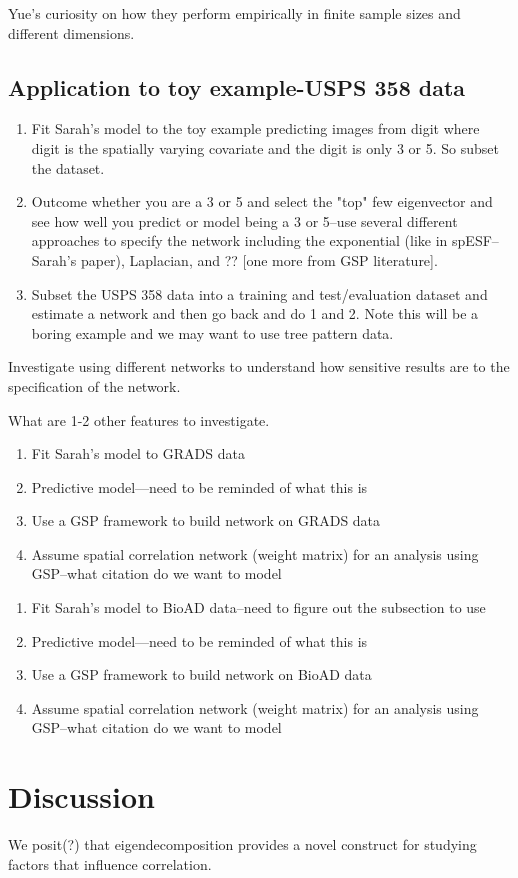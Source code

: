\documentclass[12pt]{article}
\begin{document}
Yue's curiosity on how they perform empirically in finite sample sizes and different dimensions.

\subsection{Application to toy example-USPS 358 data}
\begin{enumerate}
	\item Fit Sarah's model to the toy example predicting images from digit where digit is the spatially varying covariate and the digit is only 3 or 5. So subset the dataset.
	\item Outcome whether you are a 3 or 5 and select the "top" few eigenvector and see how well you predict or model being a 3 or 5--use several different approaches to specify the network including the exponential (like in spESF--Sarah's paper), Laplacian, and ?? [one more from GSP literature].
	\item Subset the USPS 358 data into a training and test/evaluation dataset and estimate a network and then go back and do 1 and 2.  Note this will be a boring example and we may want to use tree pattern data.
\end{enumerate}

Investigate using different networks to understand how sensitive results are to the specification of the network.

What are 1-2 other features to investigate.

\begin{enumerate}
	\item{Fit Sarah's model to GRADS data}
	\item{Predictive model---need to be reminded of what this is}
	\item{Use a GSP framework to build network on GRADS data}
	\item{Assume spatial correlation network (weight matrix) for an analysis using GSP--what citation do we want to model}
\end{enumerate}

\begin{enumerate}
	\item{Fit Sarah's model to BioAD data--need to figure out the subsection to use}
	\item{Predictive model---need to be reminded of what this is}
	\item{Use a GSP framework to build network on BioAD data}
	\item{Assume spatial correlation network (weight matrix) for an analysis using GSP--what citation do we want to model}
\end{enumerate}

\section{Discussion}
We posit(?) that eigendecomposition provides a novel construct for studying factors that influence correlation.
\end{document}
